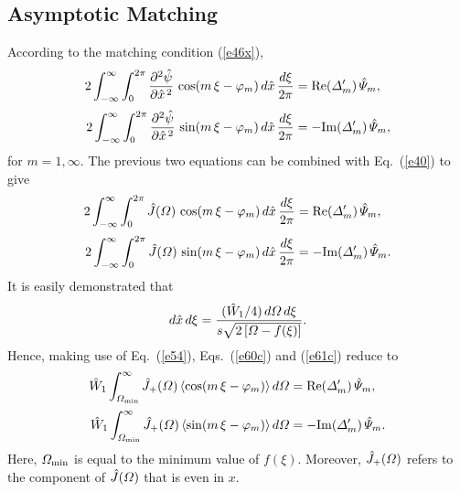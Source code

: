 \documentclass[12pt,prb,aps]{revtex4-1}
\begin{document}
\subsection{Asymptotic Matching} 
According to the matching condition (\ref{e46x}),
\begin{align}
2\int_{-\infty}^\infty \int_0^{2\pi} \frac{\partial^2\hat{\psi}}{\partial \hat{x}^{\,2}}\,\cos(m\,\xi-\varphi_m)\,d\hat{x}\,\frac{d\xi}{2\pi}& = {\rm Re}({\mit\Delta}_m')\,\hat{\mit\Psi}_m,\\[0.5ex]
2\int_{-\infty}^\infty \int_0^{2\pi} \frac{\partial^2\hat{\psi}}{\partial \hat{x}^{\,2}}\,\sin(m\,\xi-\varphi_m)\,d\hat{x}\,\frac{d\xi}{2\pi}& =-{\rm Im}({\mit\Delta}_m')\,\hat{\mit\Psi}_m,\label{e59}
\end{align}
for $m=1,\infty$. 
The previous two equations can be combined with Eq.~(\ref{e40}) to give 
\begin{align}\label{e60c}
2\int_{-\infty}^\infty \int_0^{2\pi} \hat{J}({\mit\Omega})\,\cos(m\,\xi-\varphi_m)\,d\hat{x}\,\frac{d\xi}{2\pi}& = {\rm Re}({\mit\Delta}_m')\,\hat{\mit\Psi}_m,\\[0.5ex]
2\int_{-\infty}^\infty \int_0^{2\pi} \hat{J}({\mit\Omega})\,\sin(m\,\xi-\varphi_m)\,d\hat{x}\,\frac{d\xi}{2\pi}& =-{\rm Im}({\mit\Delta}_m')\,\hat{\mit\Psi}_m.\label{e61c}
\end{align}
 It is easily demonstrated that 
\begin{equation}
d\hat{x}\,d\xi = \frac{(\hat{W}_1/4)\,d{\mit\Omega}\,d\xi}{s\sqrt{2\left[{\mit\Omega}-f(\xi)\right]}}.
\end{equation}
Hence, making use of  Eq.~(\ref{e54}), Eqs.~(\ref{e60c}) and (\ref{e61c}) reduce to 
\begin{align}\label{e63}
\hat{W}_1\int_{{\mit\Omega}_{\rm min}}^\infty\hat{J}_+({\mit\Omega})\,\langle\cos(m\,\xi-\varphi_m)\rangle\,d{\mit\Omega}&= {\rm Re}({\mit\Delta}_m')\,\hat{\mit\Psi}_m,\\[0.5ex]
\hat{W}_1\int_{{\mit\Omega}_{\rm min}}^\infty\hat{J}_+({\mit\Omega})\,\langle\sin(m\,\xi-\varphi_m)\rangle\,d{\mit\Omega}&=-{\rm Im}({\mit\Delta}_m')\,\hat{\mit\Psi}_m.\label{e64}
\end{align}
Here, ${\mit\Omega}_{\rm min}$ is equal to the minimum value of $f(\xi)$. Moreover, $\hat{J}_+({\mit\Omega})$ refers to the component of $\hat{J}({\mit\Omega})$ that is even in $x$. 
\end{document}
